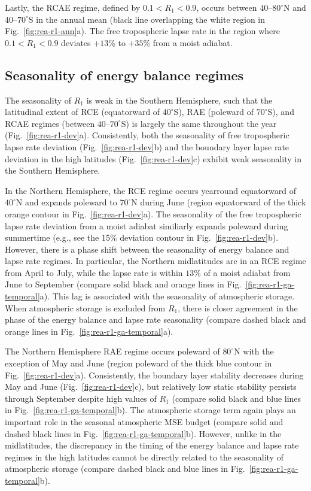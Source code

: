 \documentclass{ametsocV5}
\begin{document}
    Lastly, the RCAE regime, defined by $0.1 < R_1 < 0.9$, occurs between $40$--$80^\circ$N and $40$--$70^\circ$S in the annual mean (black line overlapping the white region in Fig.~\ref{fig:rea-r1-ann}a). The free tropospheric lapse rate in the region where $0.1 < R_1 < 0.9$ deviates $+13$\% to $+35$\% from a moist adiabat.

    \subsection{Seasonality of energy balance regimes} \label{subsec:seasonality}
    The seasonality of $R_1$ is weak in the Southern Hemisphere, such that the latitudinal extent of RCE (equatorward of $40^\circ$S), RAE (poleward of $70^\circ$S), and RCAE regimes (between $40$--$70^\circ$S) is largely the same throughout the year (Fig.~\ref{fig:rea-r1-dev}a). Consistently, both the seasonality of free tropospheric lapse rate deviation (Fig.~\ref{fig:rea-r1-dev}b) and the boundary layer lapse rate deviation in the high latitudes (Fig.~\ref{fig:rea-r1-dev}c) exhibit weak seasonality in the Southern Hemisphere.

    In the Northern Hemisphere, the RCE regime occurs yearround equatorward of $40^\circ$N and expands poleward to $70^\circ$N during June (region equatorward of the thick orange contour in Fig.~\ref{fig:rea-r1-dev}a). The seasonality of the free tropospheric lapse rate deviation from a moist adiabat similiarly expands poleward during summertime (e.g., see the 15\% deviation contour in Fig.~\ref{fig:rea-r1-dev}b). However, there is a phase shift between the seasonality of energy balance and lapse rate regimes. In particular, the Northern midlatitudes are in an RCE regime from April to July, while the lapse rate is within $13$\% of a moist adiabat from June to September (compare solid black and orange lines in Fig.~\ref{fig:rea-r1-ga-temporal}a). This lag is associated with the seasonality of atmospheric storage. When atmospheric storage is excluded from $R_1$, there is closer agreement in the phase of the energy balance and lapse rate seasonality (compare dashed black and orange lines in Fig.~\ref{fig:rea-r1-ga-temporal}a).

    The Northern Hemisphere RAE regime occurs poleward of $80^\circ$N with the exception of May and June (region poleward of the thick blue contour in Fig.~\ref{fig:rea-r1-dev}a). Consistently, the boundary layer stability decreases during May and June (Fig.~\ref{fig:rea-r1-dev}c), but relatively low static stability persists through September despite high values of $R_1$ (compare solid black and blue lines in Fig.~\ref{fig:rea-r1-ga-temporal}b). The atmospheric storage term again plays an important role in the seasonal atmospheric MSE budget (compare solid and dashed black lines in Fig.~\ref{fig:rea-r1-ga-temporal}b). However, unlike in the midlatitudes, the discrepancy in the timing of the energy balance and lapse rate regimes in the high latitudes cannot be directly related to the seasonality of atmospheric storage (compare dashed black and blue lines in Fig.~\ref{fig:rea-r1-ga-temporal}b).
\end{document}
